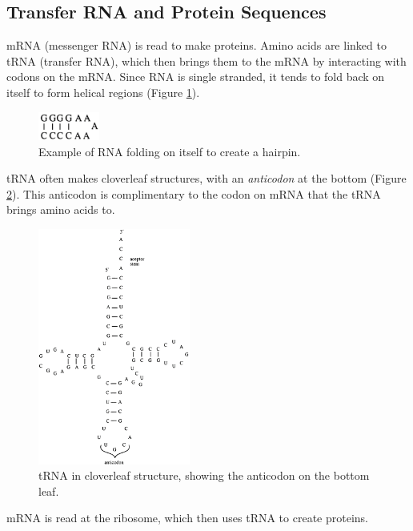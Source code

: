\documentclass[../waterman_intro_comp_bio.tex]{subfiles}
\begin{document}
    \subsection{Transfer RNA and Protein Sequences}
        \begin{outline}
            \1 mRNA (messenger RNA) is read to make proteins.
            \1 Amino acids are linked to tRNA (transfer RNA), which then brings them to the mRNA by interacting with codons on the mRNA.
            \1 Since RNA is single stranded, it tends to fold back on itself to form helical regions (Figure \ref{RNA_hairpin}).
                \begin{figure}[h!]
                    \centering
                    \includegraphics[width=2cm]{ch1/figs/RNA_hairpin.jpg}
                    \caption{Example of RNA folding on itself to create a hairpin.}
                    \label{RNA_hairpin}
                \end{figure}

            \1 tRNA often makes cloverleaf structures, with an \textit{anticodon} at the bottom (Figure \ref{tRNA_cloverleaf}).
                \2 This anticodon is complimentary to the codon on mRNA that the tRNA brings amino acids to.
                \begin{figure}[h!]
                    \centering
                    \includegraphics[width=5cm]{ch1/figs/tRNA_cloverleaf.png}
                    \caption{tRNA in cloverleaf structure, showing the anticodon on the bottom leaf.}
                    \label{tRNA_cloverleaf}
                \end{figure}
            \1 mRNA is read at the ribosome, which then uses tRNA to create proteins.
        \end{outline}
\end{document}
